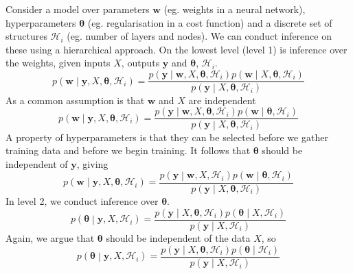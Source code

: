 \documentclass[11pt]{report} %
\begin{document}
Consider a model over parameters $\mathbf{w}$ (eg. weights in a neural network), hyperparameters $\boldsymbol{\theta}$ (eg. regularisation in a cost function) and a discrete set of structures $\mathcal{H}_{i}$ (eg. number of layers and nodes). We can conduct inference on these using a hierarchical approach. On the lowest level (level 1) is inference over the weights, given inputs $X$, outputs $\mathbf{y}$ and $\boldsymbol{\theta}$, $\mathcal{H}_{i}$.
\begin{equation}
p\left(\mathbf{w}\middle|\mathbf{y}, X, \boldsymbol{\theta}, \mathcal{H}_{i}\right) = \dfrac{p\left(\mathbf{y}\middle|\mathbf{w}, X, \boldsymbol{\theta}, \mathcal{H}_{i}\right)p\left(\mathbf{w}\middle|X, \boldsymbol{\theta}, \mathcal{H}_{i}\right)}{p\left(\mathbf{y}\middle|X, \boldsymbol{\theta}, \mathcal{H}_{i}\right)}
\end{equation}
As a common assumption is that $\mathbf{w}$ and $X$ are independent
\begin{equation}
p\left(\mathbf{w}\middle|\mathbf{y}, X, \boldsymbol{\theta}, \mathcal{H}_{i}\right) = \dfrac{p\left(\mathbf{y}\middle|\mathbf{w}, X, \boldsymbol{\theta}, \mathcal{H}_{i}\right)p\left(\mathbf{w}\middle|\boldsymbol{\theta}, \mathcal{H}_{i}\right)}{p\left(\mathbf{y}\middle|X, \boldsymbol{\theta}, \mathcal{H}_{i}\right)}
\end{equation}
A property of hyperparameters is that they can be selected before we gather training data and before we begin training. It follows that $\boldsymbol{\theta}$ should be independent of $\mathbf{y}$, giving
\begin{equation}
p\left(\mathbf{w}\middle|\mathbf{y}, X, \boldsymbol{\theta}, \mathcal{H}_{i}\right) = \dfrac{p\left(\mathbf{y}\middle|\mathbf{w}, X, \mathcal{H}_{i}\right)p\left(\mathbf{w}\middle|\boldsymbol{\theta}, \mathcal{H}_{i}\right)}{p\left(\mathbf{y}\middle|X, \boldsymbol{\theta}, \mathcal{H}_{i}\right)}
\end{equation}
In level 2, we conduct inference over $\boldsymbol{\theta}$.
\begin{equation}
p\left(\boldsymbol{\theta}\middle|\mathbf{y}, X, \mathcal{H}_{i}\right) = \dfrac{p\left(\mathbf{y}\middle|X, \boldsymbol{\theta}, \mathcal{H}_{i}\right) p\left(\boldsymbol{\theta}\middle| X, \mathcal{H}_{i}\right)}{p\left(\mathbf{y}\middle|X, \mathcal{H}_{i}\right)}
\end{equation}
Again, we argue that $\boldsymbol{\theta}$ should be independent of the data $X$, so
\begin{equation}
p\left(\boldsymbol{\theta}\middle|\mathbf{y}, X, \mathcal{H}_{i}\right) = \dfrac{p\left(\mathbf{y}\middle|X, \boldsymbol{\theta}, \mathcal{H}_{i}\right) p\left(\boldsymbol{\theta}\middle| \mathcal{H}_{i}\right)}{p\left(\mathbf{y}\middle|X, \mathcal{H}_{i}\right)}
\end{equation}
\end{document}
